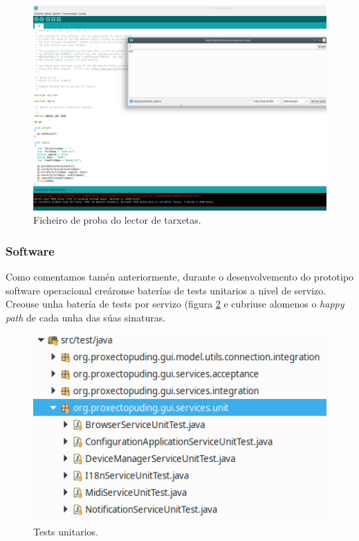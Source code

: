   \begin{figure}[htbp]
   \centering
   \includegraphics[scale=0.5,keepaspectratio=true]{./imagenes/resultado-test-lector-tarxetas.png}
   \caption{Ficheiro de proba do lector de tarxetas.}
   \label{figura:ResultadoTestUnitarioLectorTarxetas}
  \end{figure}
  
  \subsubsection{Software}
  
  Como comentamos tamén anteriormente, durante o desenvolvemento do prototipo
  software operacional creáronse baterías de tests unitarios a nivel de
  servizo. \\
  
  Creouse unha batería de tests por servizo (figura \ref{figura:TestsUnitarios}
  e cubriuse alomenos o \textit{happy path} de cada unha das súas sinaturas. \\
  
  \begin{figure}[htbp]
   \centering
   \includegraphics[scale=0.8,keepaspectratio=true]{./imagenes/tests-unitarios.png}
   \caption{Tests unitarios.}
   \label{figura:TestsUnitarios}
  \end{figure}
  
